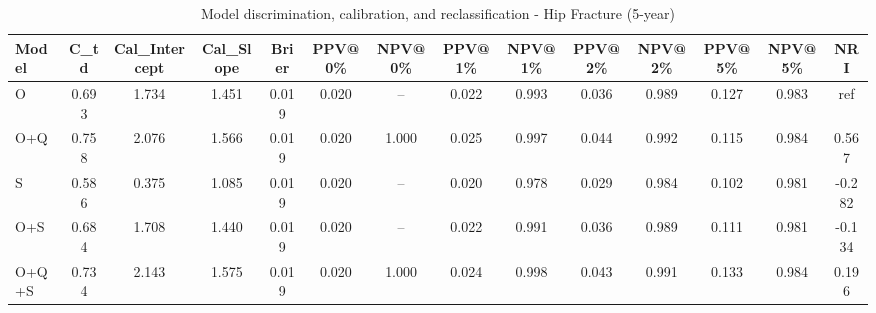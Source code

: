 \begin{table}[htbp]
\centering
\small
\caption{Model discrimination, calibration, and reclassification - Hip Fracture (5-year)}
\label{tab:perf_pd_5y}
\begin{tabular}{lccccccccccccc}
\toprule
Model & C\_td & Cal\_Intercept & Cal\_Slope & Brier & PPV@0\% & NPV@0\% & PPV@1\% & NPV@1\% & PPV@2\% & NPV@2\% & PPV@5\% & NPV@5\% & NRI \\
\midrule
O & 0.693 & 1.734 & 1.451 & 0.019 & 0.020 & -- & 0.022 & 0.993 & 0.036 & 0.989 & 0.127 & 0.983 & ref \\
O+Q & 0.758 & 2.076 & 1.566 & 0.019 & 0.020 & 1.000 & 0.025 & 0.997 & 0.044 & 0.992 & 0.115 & 0.984 & 0.567 \\
S & 0.586 & 0.375 & 1.085 & 0.019 & 0.020 & -- & 0.020 & 0.978 & 0.029 & 0.984 & 0.102 & 0.981 & -0.282 \\
O+S & 0.684 & 1.708 & 1.440 & 0.019 & 0.020 & -- & 0.022 & 0.991 & 0.036 & 0.989 & 0.111 & 0.981 & -0.134 \\
O+Q+S & 0.734 & 2.143 & 1.575 & 0.019 & 0.020 & 1.000 & 0.024 & 0.998 & 0.043 & 0.991 & 0.133 & 0.984 & 0.196 \\
\bottomrule
\end{tabular}
\end{table}